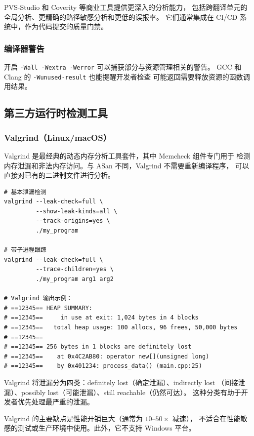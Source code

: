 \documentclass[12pt,a4paper,fontset=fandol]{ctexbook}
\begin{document}
PVS-Studio 和 Coverity 等商业工具提供更深入的分析能力，
包括跨翻译单元的全局分析、更精确的路径敏感分析和更低的误报率。
它们通常集成在 CI/CD 系统中，作为代码提交的质量门禁。

\subsubsection*{编译器警告}

开启 \texttt{-Wall -Wextra -Werror} 可以捕获部分与资源管理相关的警告。
GCC 和 Clang 的 \texttt{-Wunused-result} 也能提醒开发者检查
可能返回需要释放资源的函数调用结果。

\subsection{第三方运行时检测工具}

\subsubsection*{Valgrind（Linux/macOS）}

Valgrind 是最经典的动态内存分析工具套件，其中 Memcheck 组件专门用于
检测内存泄漏和非法内存访问。与 ASan 不同，Valgrind 不需要重新编译程序，
可以直接对已有的二进制文件进行分析。

\begin{lstlisting}[style=bashstyle, caption={Valgrind Memcheck 使用}]
# 基本泄漏检测
valgrind --leak-check=full \
         --show-leak-kinds=all \
         --track-origins=yes \
         ./my_program

# 带子进程跟踪
valgrind --leak-check=full \
         --trace-children=yes \
         ./my_program arg1 arg2

# Valgrind 输出示例：
# ==12345== HEAP SUMMARY:
# ==12345==     in use at exit: 1,024 bytes in 4 blocks
# ==12345==   total heap usage: 100 allocs, 96 frees, 50,000 bytes
# ==12345==
# ==12345== 256 bytes in 1 blocks are definitely lost
# ==12345==    at 0x4C2AB80: operator new[](unsigned long)
# ==12345==    by 0x401234: process_data() (main.cpp:25)
\end{lstlisting}

Valgrind 将泄漏分为四类：definitely lost（确定泄漏）、indirectly lost
（间接泄漏）、possibly lost（可能泄漏）、still reachable（仍然可达）。
这种分类有助于开发者优先处理最严重的泄漏。

Valgrind 的主要缺点是性能开销巨大（通常为 $10$--$50\times$ 减速），
不适合在性能敏感的测试或生产环境中使用。此外，它不支持 Windows 平台。
\end{document}
